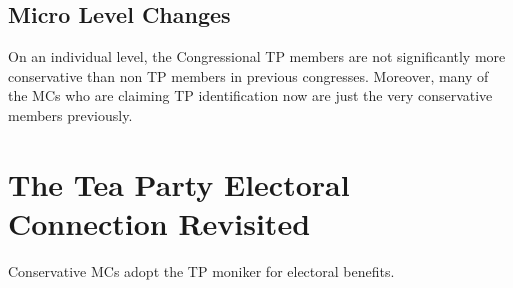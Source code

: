 \documentclass[12pt]{article}
\begin{document}
\subsection{Micro Level Changes}
On an individual level, the Congressional TP members are not significantly more conservative than non TP members in previous congresses. Moreover, many of the MCs who are claiming TP identification now are just the very conservative members previously.

\section{The Tea Party Electoral Connection Revisited}
Conservative MCs adopt the TP moniker for electoral benefits.

\newpage
    {}


\end{document}
